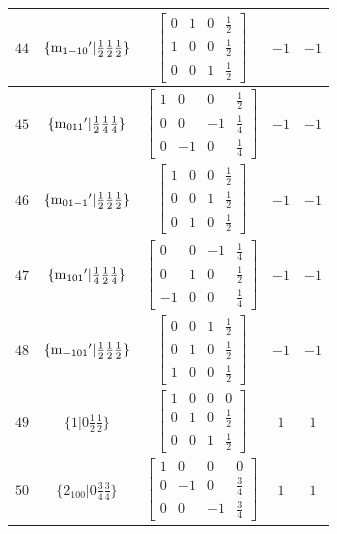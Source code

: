 \documentclass[fleqn,8pt]{jsarticle}
\begin{document}
\begin{longtable}{ccccc}
$ 44 $ & $ \{{\rm m}_{1-10}{}'|\frac{1}{2} \frac{1}{2} \frac{1}{2}\} $ & $ \begin{bmatrix} 0 & 1 & 0 & \frac{1}{2} \\ 1 & 0 & 0 & \frac{1}{2} \\ 0 & 0 & 1 & \frac{1}{2} \end{bmatrix} $ & $ -1 $ & $ -1 $ \\ \hline
$ 45 $ & $ \{{\rm m}_{011}{}'|\frac{1}{2} \frac{1}{4} \frac{1}{4}\} $ & $ \begin{bmatrix} 1 & 0 & 0 & \frac{1}{2} \\ 0 & 0 & -1 & \frac{1}{4} \\ 0 & -1 & 0 & \frac{1}{4} \end{bmatrix} $ & $ -1 $ & $ -1 $ \\ \hline
$ 46 $ & $ \{{\rm m}_{01-1}{}'|\frac{1}{2} \frac{1}{2} \frac{1}{2}\} $ & $ \begin{bmatrix} 1 & 0 & 0 & \frac{1}{2} \\ 0 & 0 & 1 & \frac{1}{2} \\ 0 & 1 & 0 & \frac{1}{2} \end{bmatrix} $ & $ -1 $ & $ -1 $ \\ \hline
$ 47 $ & $ \{{\rm m}_{101}{}'|\frac{1}{4} \frac{1}{2} \frac{1}{4}\} $ & $ \begin{bmatrix} 0 & 0 & -1 & \frac{1}{4} \\ 0 & 1 & 0 & \frac{1}{2} \\ -1 & 0 & 0 & \frac{1}{4} \end{bmatrix} $ & $ -1 $ & $ -1 $ \\ \hline
$ 48 $ & $ \{{\rm m}_{-101}{}'|\frac{1}{2} \frac{1}{2} \frac{1}{2}\} $ & $ \begin{bmatrix} 0 & 0 & 1 & \frac{1}{2} \\ 0 & 1 & 0 & \frac{1}{2} \\ 1 & 0 & 0 & \frac{1}{2} \end{bmatrix} $ & $ -1 $ & $ -1 $ \\ \hline
$ 49 $ & $ \{1|0 \frac{1}{2} \frac{1}{2}\} $ & $ \begin{bmatrix} 1 & 0 & 0 & 0 \\ 0 & 1 & 0 & \frac{1}{2} \\ 0 & 0 & 1 & \frac{1}{2} \end{bmatrix} $ & $ 1 $ & $ 1 $ \\ \hline
$ 50 $ & $ \{2{}_{100}|0 \frac{3}{4} \frac{3}{4}\} $ & $ \begin{bmatrix} 1 & 0 & 0 & 0 \\ 0 & -1 & 0 & \frac{3}{4} \\ 0 & 0 & -1 & \frac{3}{4} \end{bmatrix} $ & $ 1 $ & $ 1 $ \\ \hline

\end{longtable}
\end{document}
